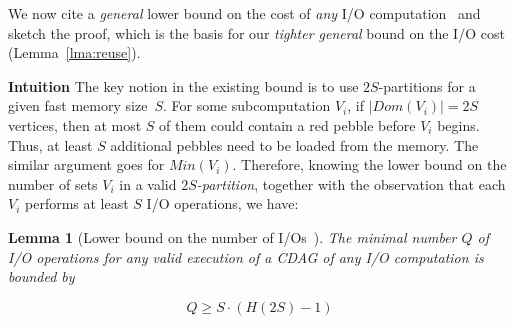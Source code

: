 \documentclass[sigplan,review,anonymous]{acmart}\settopmatter{printfolios=true,printccs=false,printacmref=false}
\newcommand\mac[1]{\textcolor{red}{[Mac: #1]}}
\newtheorem{lma}{Lemma}
\newcommand{\macb}[1]{\textbf{\textsf{#1}}}
\begin{document}
We now cite a \emph{general} lower bound on the cost of \emph{any} I/O
computation~\cite{redblue} and sketch the proof, which is the basis for our
\emph{tighter general} bound on the I/O cost (Lemma~\ref{lma:reuse}).

\macb{Intuition}
%
The key notion in the existing bound is to use $2S$-partitions for a given fast
memory size~$S$.
%
For some subcomputation $V_i$, if $|Dom(V_i)| = 2S$ vertices, then at most $S$
of them could contain a red pebble before $V_i$ begins.  Thus, at least $S$
additional pebbles need to be loaded from the memory.  The similar argument
goes for $Min(V_i)$. Therefore, knowing the lower bound on the number of sets
$V_i$ in a valid \emph{$2S$-partition}, together with the observation that each
$V_i$ performs at least $S$ I/O operations, we have:
%
%

\begin{lma}[Lower bound on the number of I/Os~\cite{redblue}]
	The minimal number $Q$ of I/O operations for any valid execution of a CDAG 
	of
	any I/O computation is bounded by
	
	\begin{equation}
	\label{eq:redbluebound}
	Q \ge S \cdot (H(2S) - 1)
	\end{equation}
\end{lma}
\end{document}
